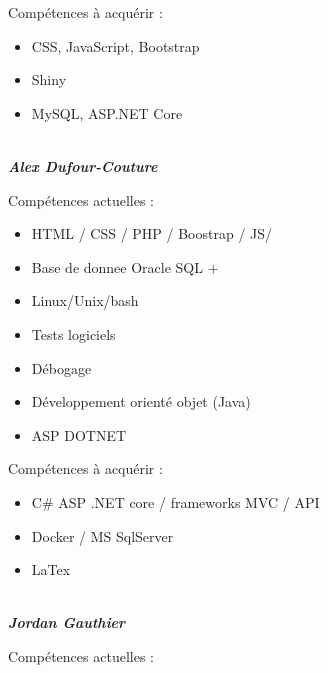 \documentclass[letter,12pt]{exam}
\begin{document}
Compétences à acquérir :

\begin{itemize}

\item CSS, JavaScript, Bootstrap

\item Shiny

\item MySQL, ASP.NET Core

\end{itemize}

\\

\textbf{\emph{Alex Dufour-Couture}}

Compétences actuelles :

\begin{itemize}
\item HTML / CSS / PHP / Boostrap / JS/ 

\item Base de donnee Oracle SQL +

\item Linux/Unix/bash

\item Tests logiciels

\item Débogage

\item Développement orienté objet (Java)

\item ASP DOTNET 

\end{itemize}


Compétences à acquérir :

\begin{itemize}

\item C# ASP .NET core / frameworks MVC / API

\item Docker / MS SqlServer

\item LaTex


\end{itemize}

\\

\textbf{\emph{Jordan Gauthier}}

Compétences actuelles :
\end{document}
